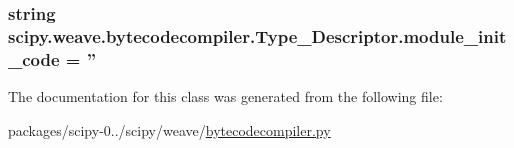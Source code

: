 \subsubsection[{module\+\_\+init\+\_\+code}]{\setlength{\rightskip}{0pt plus 5cm}string scipy.\+weave.\+bytecodecompiler.\+Type\+\_\+\+Descriptor.\+module\+\_\+init\+\_\+code = ''\hspace{0.3cm}{\ttfamily [static]}}\label{classscipy_1_1weave_1_1bytecodecompiler_1_1Type__Descriptor_a1a5791dac8c9ab0bdaa5664387e87975}


The documentation for this class was generated from the following file\+:\begin{DoxyCompactItemize}
\item 
packages/scipy-\/0../scipy/weave/\hyperlink{bytecodecompiler_8py}{bytecodecompiler.\+py}\end{DoxyCompactItemize}
